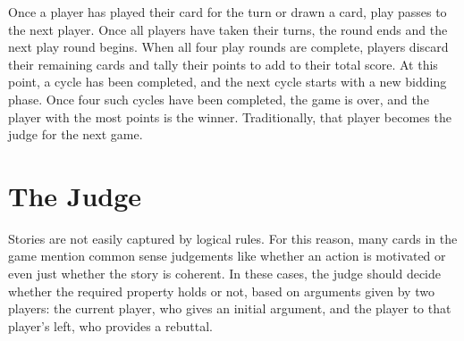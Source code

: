 \documentclass[12pt]{article}
\begin{document}
Once a player has played their card for the turn or drawn a card, play passes to the next player.
%
Once all players have taken their turns, the round ends and the next play round begins.
%
When all four play rounds are complete, players discard their remaining cards and tally their points to add to their total score.
%
At this point, a cycle has been completed, and the next cycle starts with a new bidding phase.
%
Once four such cycles have been completed, the game is over, and the player with the most points is the winner.
%
Traditionally, that player becomes the judge for the next game.

\section{The Judge}

Stories are not easily captured by logical rules.
%
For this reason, many cards in the game mention common sense judgements like whether an action is motivated or even just whether the story is coherent.
%
In these cases, the judge should decide whether the required property holds or not, based on arguments given by two players: the current player, who gives an initial argument, and the player to that player's left, who provides a rebuttal.
\end{document}
